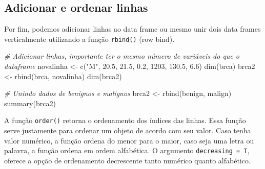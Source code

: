 \documentclass[
]{book}
\newenvironment{Shaded}{\begin{snugshade}}{\end{snugshade}}
\newcommand{\CommentTok}[1]{\textcolor[rgb]{0.56,0.35,0.01}{\textit{#1}}}
\newcommand{\DecValTok}[1]{\textcolor[rgb]{0.00,0.00,0.81}{#1}}
\newcommand{\FloatTok}[1]{\textcolor[rgb]{0.00,0.00,0.81}{#1}}
\newcommand{\FunctionTok}[1]{\textcolor[rgb]{0.00,0.00,0.00}{#1}}
\newcommand{\NormalTok}[1]{#1}
\newcommand{\OtherTok}[1]{\textcolor[rgb]{0.56,0.35,0.01}{#1}}
\newcommand{\SpecialCharTok}[1]{\textcolor[rgb]{0.00,0.00,0.00}{#1}}
\newcommand{\StringTok}[1]{\textcolor[rgb]{0.31,0.60,0.02}{#1}}
\begin{document}
\begin{Shaded}
\end{Shaded}

\hypertarget{adicionar-e-ordenar-linhas}{%
\subsection{Adicionar e ordenar linhas}\label{adicionar-e-ordenar-linhas}}

Por fim, podemos adicionar linhas ao data frame ou mesmo unir dois data frames verticalmente utilizando a função \texttt{rbind()} (row bind).

\begin{Shaded}
\begin{Highlighting}[]
\CommentTok{\# Adicionar linhas, importante ter o mesmo número de variáveis do que o dataframe}
\NormalTok{novalinha }\OtherTok{\textless{}{-}} \FunctionTok{c}\NormalTok{(}\StringTok{"M"}\NormalTok{, }\FloatTok{20.5}\NormalTok{, }\FloatTok{21.5}\NormalTok{, }\FloatTok{0.2}\NormalTok{, }\DecValTok{1203}\NormalTok{, }\FloatTok{130.5}\NormalTok{, }\FloatTok{6.6}\NormalTok{)}
\FunctionTok{dim}\NormalTok{(brca)}
\NormalTok{brca2 }\OtherTok{\textless{}{-}} \FunctionTok{rbind}\NormalTok{(brca, novalinha)}
\FunctionTok{dim}\NormalTok{(brca2)}

\CommentTok{\# Unindo dados de benignos e malignos}
\NormalTok{brca2 }\OtherTok{\textless{}{-}} \FunctionTok{rbind}\NormalTok{(benign, malign)}
\FunctionTok{summary}\NormalTok{(brca2)}
\end{Highlighting}
\end{Shaded}

A função \texttt{order()} retorna o ordenamento dos índices das linhas. Essa função serve justamente para ordenar um objeto de acordo com seu valor. Caso tenha valor numérico, a função ordena do menor para o maior, caso seja uma letra ou palavra, a função ordena em ordem alfabética. O argumento \texttt{decreasing\ =\ T}, oferece a opção de ordenamento decrescente tanto numérico quanto alfabético.
\end{document}
